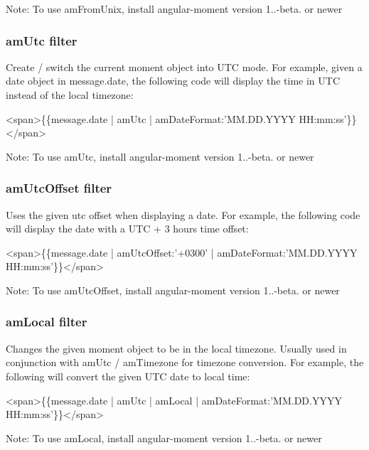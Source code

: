 Note\+: To use {\ttfamily am\+From\+Unix}, install angular-\/moment version 1..-\/beta. or newer

\subsubsection*{am\+Utc filter}

Create / switch the current moment object into U\+TC mode. For example, given a date object in {\ttfamily message.\+date}, the following code will display the time in U\+TC instead of the local timezone\+:


\begin{DoxyCode}
<span>\{\{message.date | amUtc | amDateFormat:'MM.DD.YYYY HH:mm:ss'\}\}</span>
\end{DoxyCode}


Note\+: To use {\ttfamily am\+Utc}, install angular-\/moment version 1..-\/beta. or newer

\subsubsection*{am\+Utc\+Offset filter}

Uses the given utc offset when displaying a date. For example, the following code will display the date with a U\+TC + 3 hours time offset\+:


\begin{DoxyCode}
<span>\{\{message.date | amUtcOffset:'+0300' | amDateFormat:'MM.DD.YYYY HH:mm:ss'\}\}</span>
\end{DoxyCode}


Note\+: To use {\ttfamily am\+Utc\+Offset}, install angular-\/moment version 1..-\/beta. or newer

\subsubsection*{am\+Local filter}

Changes the given moment object to be in the local timezone. Usually used in conjunction with {\ttfamily am\+Utc} / {\ttfamily am\+Timezone} for timezone conversion. For example, the following will convert the given U\+TC date to local time\+:


\begin{DoxyCode}
<span>\{\{message.date | amUtc | amLocal | amDateFormat:'MM.DD.YYYY HH:mm:ss'\}\}</span>
\end{DoxyCode}


Note\+: To use {\ttfamily am\+Local}, install angular-\/moment version 1..-\/beta. or newer

